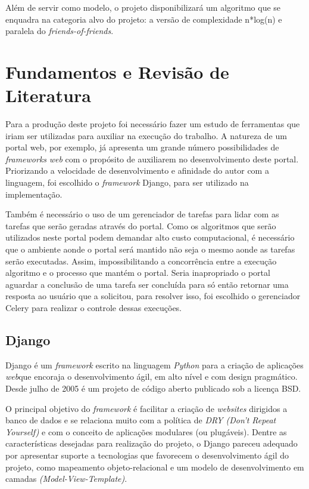 \documentclass[tg]{mdtufsm}
\begin{document}
Além de servir como modelo, o projeto disponibilizará um algoritmo que se enquadra na categoria alvo do projeto: a versão de complexidade n*log(n) e paralela do \emph{friends-of-friends}.



\chapter{Fundamentos e Revisão de Literatura}
Para a produção deste projeto foi necessário fazer um estudo de ferramentas que iriam ser utilizadas para auxiliar na execução do trabalho. A natureza de um portal web, por exemplo, já apresenta um grande número possibilidades de \emph{frameworks} \emph{web} com o propósito de auxiliarem no desenvolvimento deste portal. Priorizando a velocidade de desenvolvimento e afinidade do autor com a linguagem, foi escolhido o \emph{framework} Django\cite{Django}, para ser utilizado na implementação.

Também é necessário o uso de um gerenciador de tarefas para lidar com as tarefas que serão geradas através do portal. Como os algoritmos que serão utilizados neste portal podem demandar  alto custo computacional, é necessário que o ambiente aonde o portal será mantido não seja o mesmo aonde as tarefas serão executadas. Assim, impossibilitando a concorrência entre a execução algoritmo e o processo que mantém o portal. Seria inapropriado o portal aguardar a conclusão de uma tarefa ser concluída para só então retornar uma resposta ao usuário que a solicitou, para resolver isso, foi escolhido o gerenciador Celery\cite{Celery} para realizar o controle dessas execuções.

\section{Django}
Django é um \emph{framework} escrito na linguagem \emph{Python} para a criação de aplicações \emph{web}que encoraja o desenvolvimento ágil, em alto nível e com design pragmático. Desde julho de 2005 é um projeto de código aberto publicado sob a licença BSD.

O principal objetivo do \emph{framework} é facilitar a criação de \emph{websites} dirigidos a banco de dados e se relaciona muito com a política de \emph{DRY (Don't Repeat Yourself)} e com o conceito de aplicações modulares (ou plugáveis). Dentre as características desejadas para realização do projeto, o Django pareceu adequado por apresentar suporte a tecnologias que favorecem o desenvolvimento ágil do projeto, como mapeamento objeto-relacional e um modelo de desenvolvimento em camadas \emph{(Model-View-Template)}.
\end{document}
